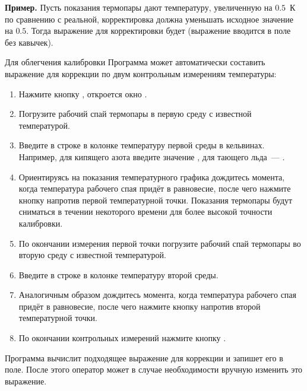 {\bf Пример. } Пусть показания термопары дают температуру, увеличенную на $0.5$~К по сравнению с реальной, корректировка должна уменьшать исходное значение на $0.5$. Тогда выражение для корректировки будет \mbox{} (выражение вводится в поле без кавычек).

\bigskip

Для облегчения калибровки Программа может автоматически составить выражение для коррекции по двум контрольным измерениям температуры:

\begin{enumerate}
\item Нажмите кнопку , откроется окно .
\item Погрузите рабочий спай термопары в первую среду с известной температурой.
\item Введите в строке  в колонке  температуру первой среды в кельвинах. Например, для кипящего азота введите значение , для тающего льда~--- .
\item Ориентируясь на показания температурного графика дождитесь момента, когда температура рабочего спая придёт в равновесие, после чего нажмите кнопку  напротив первой температурной точки. Показания термопары будут сниматься в течении некоторого времени для более высокой точности калибровки.
\item По окончании измерения первой точки погрузите рабочий спай термопары во вторую среду с известной температурой.
\item Введите в строке  в колонке  температуру второй среды.
\item Аналогичным образом дождитесь момента, когда температура рабочего спая придёт в равновесие, после чего нажмите кнопку  напротив второй температурной точки.
\item По окончании контрольных измерений нажмите кнопку .
\end{enumerate}

Программа вычислит подходящее выражение для коррекции и запишет его в поле. После этого оператор может в случае необходимости вручную изменить это выражение.